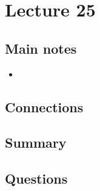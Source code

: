 \section{Lecture 25}
\subsection{Main notes}


\begin{itemize}
	\item
\end{itemize}


\subsection{Connections}


\subsection{Summary}


\subsection{Questions}
